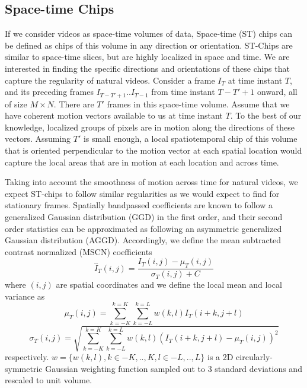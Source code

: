 \documentclass[conference]{IEEEtran}
\begin{document}
\subsection{Space-time Chips}
If we consider videos as space-time volumes of data, Space-time (ST) chips can be defined as chips of this volume in any direction or orientation. ST-Chips are similar to space-time slices\cite{sts1,sts2,sts3}, but are highly localized in space and time. We are interested in finding the specific directions and orientations of these chips that capture the regularity of natural videos. Consider a frame $I_T$ at time instant $T$, and its preceding frames $I_{T-T'+1}..I_{T-1}$ from time instant $T-T'+1$ onward, all of size $M \times N$. There are $T'$ frames in this space-time volume. Assume that we have coherent motion vectors available to us at time instant $T$. To the best of our knowledge, localized groups of pixels are in motion along the directions of these vectors. Assuming $T'$ is small enough, a local spatiotemporal chip of this volume that is oriented perpendicular to the motion vector at each spatial location would capture the local areas that are in motion at each location and across time. 

Taking into account the smoothness of motion across time for natural videos, we expect ST-chips to follow similar regularities as we would expect to find for stationary frames. Spatially bandpassed coefficients are known to follow a generalized Gaussian distribution (GGD) in the first order, and their second order statistics can be approximated as following an asymmetric generalized Gaussian distribution (AGGD)\cite{niqe,brisque}. Accordingly, we define the mean subtracted contrast normalized (MSCN) coefficients
\begin{equation}
    \hat{I}_T(i,j) = \frac{I_T(i,j)-\mu_T(i,j)}{\sigma_T(i,j)+C}
 \end{equation}
  where $(i,j)$ are spatial coordinates and we define the local mean and local variance as
  \begin{equation}
  \mu_T(i,j) = \sum\limits_{k=-K}^{k=K} \sum\limits_{k=-L}^{k=L} w(k,l) I_T(i+k,j+l)
  \end{equation}
\begin{equation}
\sigma_T(i,j) = \sqrt{\sum\limits_{k=-K}^{k=K} \sum\limits_{k=-L}^{k=L} w(k,l) (I_T(i+k,j+l)-\mu_T(i,j))^2}
\end{equation}
respectively. $w = \{w(k,l), k\in -K,..,K, l\in -L,..,L\}$ is a 2D circularly-symmetric Gaussian weighting function sampled out to 3 standard deviations and rescaled to unit volume.
\end{document}

